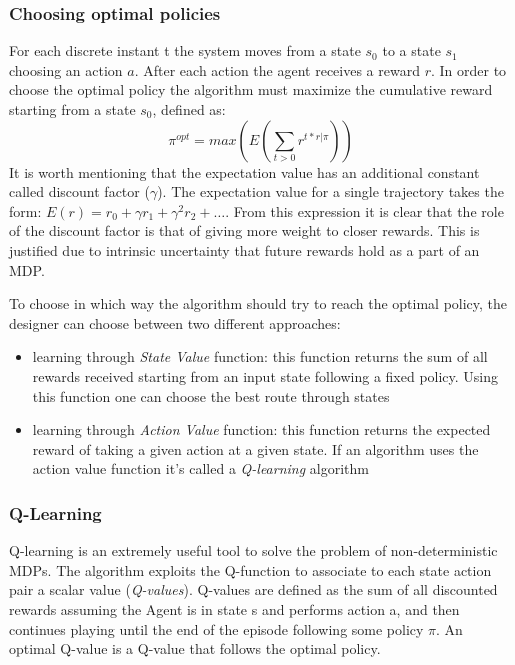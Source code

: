 \subsubsection{Choosing optimal policies}

For each discrete instant t the system moves from a state $s_{0}$ to a state $s_{1}$ choosing an action $a$. After each action the agent receives a reward $r$. 
In order to choose the optimal policy the algorithm must maximize the cumulative reward starting from a state $s_{0}$, defined as: 
\begin{equation}
\pi^{opt} = max(E(\sum_{t>0}r^{t*r|\pi}))
\end{equation}
It is worth mentioning that the expectation value has an additional constant called discount factor ($\gamma$).
The expectation value for a single trajectory takes the form: $E(r) = r_{0} + \gamma r_{1} + \gamma^{2} r_{2} + \ldots$.
From this expression it is clear that the role of the discount factor is that of giving more weight to closer rewards. This is justified due to intrinsic uncertainty that future rewards hold as a part of an MDP.

To choose in which way the algorithm should try to reach the optimal policy, the designer can choose between two different approaches:

\begin{itemize}
    \item learning through \emph{State Value} function: this function returns the sum of all rewards received starting from an input state following a fixed policy.
        Using this function one can choose the best route through states
    \item learning through \emph{Action Value} function: this function returns the expected reward of taking a given action at a given state.
        If an algorithm uses the action value function it's called a \emph{Q-learning} algorithm    
\end{itemize}

\subsubsection{Q-Learning}

Q-learning is an extremely useful tool to solve the problem of non-deterministic MDPs.
The algorithm exploits the Q-function to associate to each state action pair a scalar value (\emph{Q-values}).
Q-values are defined as the sum of all discounted rewards assuming the Agent is in state s and performs action a, and then continues playing until the end of the episode following some policy $\pi$.
An optimal Q-value is a Q-value that follows the optimal policy.

